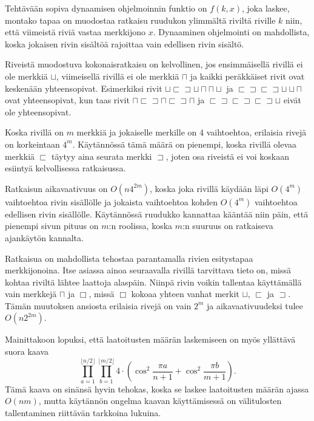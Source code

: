 Tehtävään sopiva dynaamisen ohjelmoinnin funktio on $f(k,x)$,
joka laskee, montako tapaa on muodostaa ratkaisu
ruudukon ylimmältä riviltä riville $k$ niin,
että viimeistä riviä vastaa merkkijono $x$.
Dynaaminen ohjelmointi on mahdollista,
koska jokaisen rivin sisältöä
rajoittaa vain edellisen rivin sisältö.

Riveistä muodostuva kokonaisratkaisu on kelvollinen,
jos ensimmäisellä rivillä ei ole merkkiä $\sqcup$,
viimeisellä rivillä ei ole merkkiä $\sqcap$
ja kaikki peräkkäiset rivit ovat keskenään yhteensopivat.
Esimerkiksi rivit
$\sqcup \sqsubset \sqsupset \sqcup \sqcap \sqcap \sqcup$ ja
$\sqsubset \sqsupset \sqsubset \sqsupset \sqcup \sqcup \sqcap$ 
ovat yhteensopivat,
kun taas rivit
$\sqcap \sqsubset \sqsupset \sqcap \sqsubset \sqsupset \sqcap$ ja
$\sqsubset \sqsupset \sqsubset \sqsupset \sqsubset \sqsupset \sqcup$
eivät ole yhteensopivat.

Koska rivillä on $m$ merkkiä ja jokaiselle merkille on 4
vaihtoehtoa, erilaisia rivejä on korkeintaan $4^m$.
Käytännössä tämä määrä on pienempi,
koska rivillä olevaa merkkiä $\sqsubset$
täytyy aina seurata merkki $\sqsupset$,
joten osa riveistä ei voi koskaan esiintyä
kelvollisessa ratkaisussa.

Ratkaisun aikavaativuus on $O(n 4^{2m})$,
koska joka rivillä käydään läpi $O(4^m)$
vaihtoehtoa rivin sisällölle
ja jokaista vaihtoehtoa kohden $O(4^m)$
vaihtoehtoa edellisen rivin sisällölle.
Käytännössä ruudukko kannattaa kääntää niin
päin, että pienempi sivun pituus on $m$:n roolissa,
koska $m$:n suuruus on ratkaiseva ajankäytön kannalta.

Ratkaisua on mahdollista tehostaa parantamalla rivien esitystapaa merkkijonoina.
Itse asiassa ainoa seuraavalla rivillä tarvittava tieto on,
missä kohtaa riviltä lähtee laattoja alaspäin.
Niinpä rivin voikin tallentaa käyttämällä vain merkkejä
$\sqcap$ ja $\Box$, missä $\Box$ kokoaa yhteen vanhat merkit
$\sqcup$, $\sqsubset$ ja $\sqsupset$.
Tämän muutoksen ansiosta erilaisia rivejä on vain $2^m$
ja aikavaativuudeksi tulee $O(n 2^{2m})$.

Mainittakoon lopuksi, että laatoitusten määrän laskemiseen
on myös yllättävä suora kaava
\[ \prod_{a=1}^{\lfloor n/2 \rfloor} \prod_{b=1}^{\lfloor m/2 \rfloor} 4 \cdot (\cos^2 \frac{\pi a}{n + 1} + \cos^2 \frac{\pi b}{m+1}).\]
Tämä kaava on sinänsä hyvin tehokas,
koska se laskee laatoitusten määrän ajassa $O(nm)$,
mutta käytännön ongelma kaavan käyttämisessä
on välitulosten tallentaminen riittävän tarkkoina lukuina.


